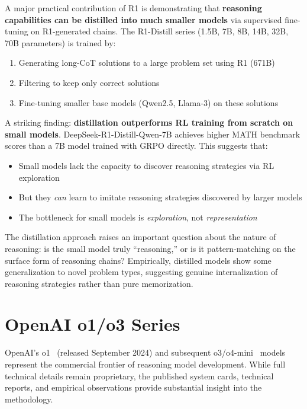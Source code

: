 A major practical contribution of R1 is demonstrating that \textbf{reasoning capabilities can be distilled into much smaller models} via supervised fine-tuning on R1-generated chains. The R1-Distill series (1.5B, 7B, 8B, 14B, 32B, 70B parameters) is trained by:

\begin{enumerate}
  \item Generating long-CoT solutions to a large problem set using R1 (671B)
  \item Filtering to keep only correct solutions
  \item Fine-tuning smaller base models (Qwen2.5, Llama-3) on these solutions
\end{enumerate}

\begin{keybox}
A striking finding: \textbf{distillation outperforms RL training from scratch on small models}. DeepSeek-R1-Distill-Qwen-7B achieves higher MATH benchmark scores than a 7B model trained with GRPO directly. This suggests that:

\begin{itemize}
  \item Small models lack the capacity to discover reasoning strategies via RL exploration
  \item But they \emph{can} learn to imitate reasoning strategies discovered by larger models
  \item The bottleneck for small models is \emph{exploration}, not \emph{representation}
\end{itemize}
\end{keybox}

The distillation approach raises an important question about the nature of reasoning: is the small model truly ``reasoning,'' or is it pattern-matching on the surface form of reasoning chains? Empirically, distilled models show some generalization to novel problem types, suggesting genuine internalization of reasoning strategies rather than pure memorization.

\section{OpenAI o1/o3 Series}
\label{subsec:openai_o1}

OpenAI’s o1~\cite{openai2024o1} (released September 2024) and subsequent o3/o4-mini~\cite{openai2025o3} models represent the commercial frontier of reasoning model development. While full technical details remain proprietary, the published system cards, technical reports, and empirical observations provide substantial insight into the methodology.

